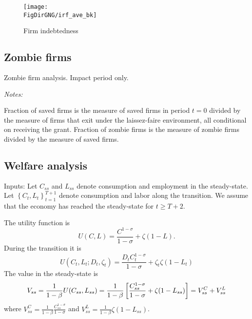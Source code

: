 \documentclass[11pt,english]{article}
\newcommand*{\TabDir}{../tables}
\newcommand*{\FigDirGNG}{../figures/grant_vs_nogrant} %
\begin{document}

\begin{figure}[htbp]
	\centering
	\texttt{[image: \\FigDirGNG/irf\_ave\_bk]}
		
	\caption{Firm indebtedness}
	\label{fig:firmdebt}
\end{figure}
	
\FloatBarrier
	
\subsection{Zombie firms}

\begin{table}[htbp]
	
	\caption{Zombie firm analysis. Impact period only.}
		
    \vspace{1ex}
    {\textit{Notes:} \raggedright Fraction of saved firms is the measure of saved firms in period $t=0$ divided by the measure of firms that exit under the laissez-faire environment, all conditional on receiving the grant. Fraction of zombie firms is the measure of zombie firms divided by the measure of saved firms.    \par}		
\end{table}	

\FloatBarrier

\subsection{Welfare analysis}	
	Inputs: Let $C_{ss}$ and $L_{ss}$ denote consumption and employment in the
steady-state. Let $\left\{ C_{t},L_{t}\right\} _{t=1}^{T+1}$ denote
consumption and labor along the transition. We assume that the economy has
reached the steady-state for $t\geq T+2$.

The utility function is%
\begin{equation*}
U(C,L)=\frac{C^{1-\sigma }}{1-\sigma }+\zeta (1-L).
\end{equation*}%
During the transition it is%
\begin{equation*}
U(C_{t},L_{t};D_t,\zeta _{t})=\frac{D_t C_{t}^{1-\sigma }}{1-\sigma }+\zeta
_{t}\zeta(1-L_{t})
\end{equation*}%
The value in the steady-state is%
\begin{equation*}
V_{ss}=\frac{1}{1-\beta }U(C_{ss},L_{ss})=\frac{1}{1-\beta }\left[ \frac{%
C_{ss}^{1-\sigma }}{1-\sigma }+\zeta (1-L_{ss})\right] =V_{ss}^{C}+V_{ss}^{L}
\end{equation*}%
where $V_{ss}^{C}=\frac{1}{1-\beta }\frac{C_{ss}^{1-\sigma }}{1-\sigma }$
and $V_{ss}^{L}=\frac{1}{1-\beta }\zeta (1-L_{ss})$.
\end{document}
